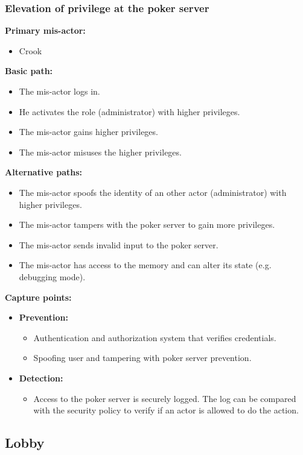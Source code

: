 \documentclass[a4paper,11pt]{report}
\begin{document}
\subsubsection{Elevation of privilege at the poker server}
\label{PokerServerCasesE}
\textbf{Primary mis-actor:}
\begin{itemize}
\item Crook
\end{itemize}
\textbf{Basic path:}
\begin{itemize}
\item The mis-actor logs in.
\item He activates the role (administrator) with higher privileges.
\item The mis-actor gains higher privileges.
\item The mis-actor misuses the higher privileges.
\end{itemize}
\textbf{Alternative paths:}
\begin{itemize}
\item The mis-actor spoofs the identity of an other actor (administrator) with higher privileges.
\item The mis-actor tampers with the poker server to gain more privileges.
\item The mis-actor sends invalid input to the poker server.
\item The mis-actor has access to the memory and can alter its state (e.g. debugging mode).
\end{itemize}
\textbf{Capture points:}
\begin{itemize}
\item \textbf{Prevention:}
\begin{itemize}
\item Authentication and authorization system that verifies credentials.
\item Spoofing user and tampering with poker server prevention.
\end{itemize}
\item \textbf{Detection:}
\begin{itemize}
\item Access to the poker server is securely logged. The log can be compared with the security policy to verify if an actor is allowed to do the action.
\end{itemize}
\end{itemize}

\subsection{Lobby}
\label{LobbyCases}
\end{document}
